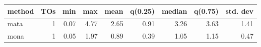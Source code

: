 \begin{tabular}{lrrrrrrrr}
\hline
 method   &   TOs &   min &   max &   mean &   q(0.25) &   median &   q(0.75) &   std. dev \\
\hline
 mata     &  1 &  0.07 &  4.77 &   2.65 &      0.91 &     3.26 &      3.63 &       1.41 \\
 mona     &  1 &  0.05 &  1.97 &   0.89 &      0.39 &     1.05 &      1.15 &       0.47 \\
\hline
\end{tabular}
